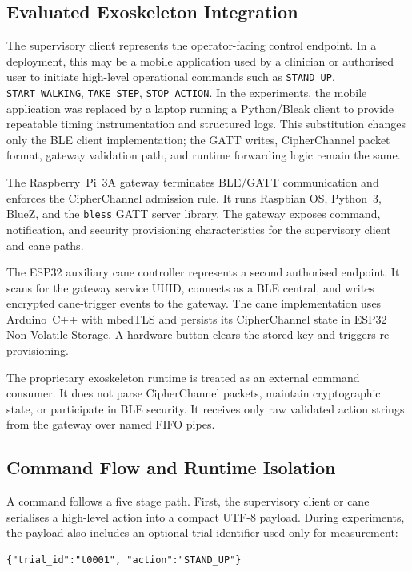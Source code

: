 \documentclass[journal]{IEEEtran}
\begin{document}
\subsection{Evaluated Exoskeleton Integration}

The supervisory client represents the operator-facing control endpoint. In a deployment, this may be a mobile application used by a clinician or authorised user to initiate high-level operational commands such as \texttt{STAND\_UP}, \texttt{START\_WALKING}, \texttt{TAKE\_STEP}, \texttt{STOP\_ACTION}. In the experiments, the mobile application was replaced by a laptop running a Python/Bleak client to provide repeatable timing instrumentation and structured logs. This substitution changes only the BLE client implementation; the GATT writes, CipherChannel packet format, gateway validation path, and runtime forwarding logic remain the same.

The Raspberry~Pi~3A gateway terminates BLE/GATT communication and enforces the CipherChannel admission rule. It runs Raspbian OS, Python~3, BlueZ, and the \texttt{bless} GATT server library. The gateway exposes command, notification, and security provisioning characteristics for the supervisory client and cane paths.

The ESP32 auxiliary cane controller represents a second authorised endpoint. It scans for the gateway service UUID, connects as a BLE central, and writes encrypted cane-trigger events to the gateway. The cane implementation uses Arduino~C++ with mbedTLS and persists its CipherChannel state in ESP32 Non-Volatile Storage. A hardware button clears the stored key and triggers re-provisioning.

The proprietary exoskeleton runtime is treated as an external command consumer. It does not parse CipherChannel packets, maintain cryptographic state, or participate in BLE security. It receives only raw validated action strings from the gateway over named FIFO pipes.

\subsection{Command Flow and Runtime Isolation}

A command follows a five stage path. First, the supervisory client or cane serialises a high-level action into a compact UTF-8 payload. During experiments, the payload also includes an optional trial identifier used only for measurement:

\begin{verbatim}
{"trial_id":"t0001", "action":"STAND_UP"}
\end{verbatim}
\end{document}
